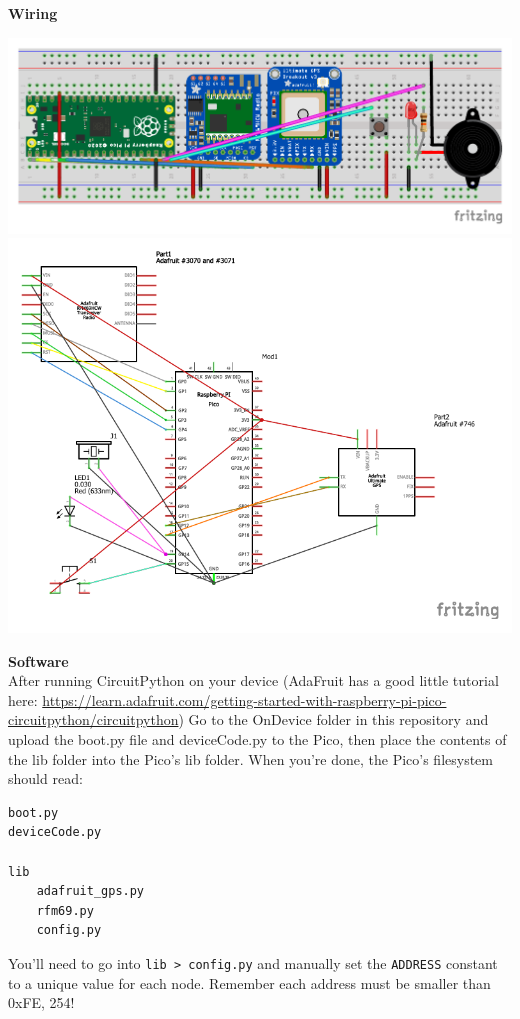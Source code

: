 \documentclass[12pt,a4paper]{report}
\begin{document}
\textbf{Wiring}
\begin{center}
\includegraphics[scale = 0.5]{breadboard.pdf} \\
\includegraphics[scale = 0.5]{wiring.pdf}
\end{center}

\textbf{Software} \\
After running CircuitPython on your device (AdaFruit has a good little tutorial here: \url{https://learn.adafruit.com/getting-started-with-raspberry-pi-pico-circuitpython/circuitpython}) 
Go to the OnDevice folder in this repository and upload the boot.py file and deviceCode.py to the Pico, then place the contents of the lib folder into the Pico's lib folder. When you're done, the Pico's filesystem should read:

\begin{verbatim}
boot.py
deviceCode.py

lib
    adafruit_gps.py
    rfm69.py
    config.py
\end{verbatim}

You'll need to go into \verb`lib > config.py` and manually set the \verb`ADDRESS` constant to a unique value for each node. Remember each address must be smaller than 0xFE, 254!   \\
\end{document}
